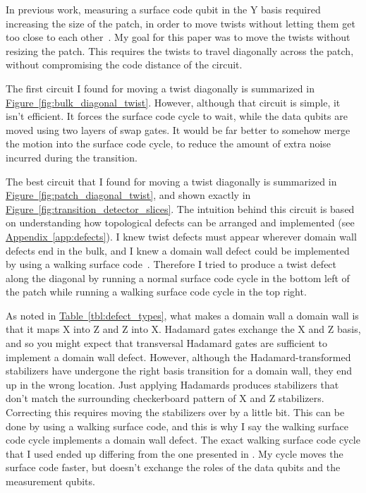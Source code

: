 \documentclass[onecolumn,unpublished,a4paper]{quantumarticle}
\theoremstyle{definition}
\theoremstyle{definition}
\theoremstyle{definition}
\DeclareRobustCommand{\app}[1]{\hyperref[app:#1]{Appendix~\ref*{app:#1}}}
\newcommand{\fig}[1]{\hyperref[fig:#1]{Figure~\ref*{fig:#1}}}
\newcommand{\tbl}[1]{\hyperref[tbl:#1]{Table~\ref*{tbl:#1}}}
\begin{document}
In previous work, measuring a surface code qubit in the Y basis required increasing the size of the patch, in order to move twists without letting them get too close to each other~\cite{brown2017surfacetwists,bombin2021logical,chamberland2022universal}.
My goal for this paper was to move the twists without resizing the patch.
This requires the twists to travel diagonally across the patch, without compromising the code distance of the circuit.

The first circuit I found for moving a twist diagonally is summarized in \fig{bulk_diagonal_twist}.
However, although that circuit is simple, it isn't efficient.
It forces the surface code cycle to wait, while the data qubits are moved using two layers of swap gates.
It would be far better to somehow merge the motion into the surface code cycle, to reduce the amount of extra noise incurred during the transition.

The best circuit that I found for moving a twist diagonally is summarized in \fig{patch_diagonal_twist}, and shown exactly in \fig{transition_detector_slices}.
The intuition behind this circuit is based on understanding how topological defects can be arranged and implemented (see \app{defects}).
I knew twist defects must appear wherever domain wall defects end in the bulk, and I knew a domain wall defect could be implemented by using a walking surface code~\cite{mcewenmidoutsurfaces2023}.
Therefore I tried to produce a twist defect along the diagonal by running a normal surface code cycle in the bottom left of the patch while running a walking surface code cycle in the top right.

As noted in \tbl{defect_types}, what makes a domain wall a domain wall is that it maps X into Z and Z into X.
Hadamard gates exchange the X and Z basis, and so you might expect that transversal Hadamard gates are sufficient to implement a domain wall defect.
However, although the Hadamard-transformed stabilizers have undergone the right basis transition for a domain wall, they end up in the wrong location.
Just applying Hadamards produces stabilizers that don't match the surrounding checkerboard pattern of X and Z stabilizers.
Correcting this requires moving the stabilizers over by a little bit.
This can be done by using a walking surface code, and this is why I say the walking surface code cycle implements a domain wall defect.
The exact walking surface code cycle that I used ended up differing from the one presented in \cite{mcewenmidoutsurfaces2023}.
My cycle moves the surface code faster, but doesn't exchange the roles of the data qubits and the measurement qubits.
\end{document}
